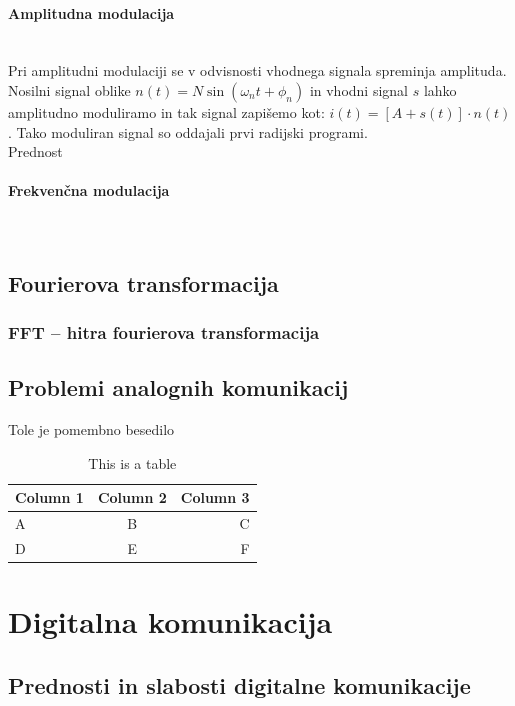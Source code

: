 \documentclass[12pt]{article}
\begin{document}
            \paragraph{Amplitudna modulacija} \mbox{}\\ 
                Pri amplitudni modulaciji se v odvisnosti vhodnega signala 
                spreminja amplituda. 
                Nosilni signal oblike $n(t) = N\sin(\omega_{n} t + \phi_{n})$ in 
                vhodni signal $s$ lahko amplitudno moduliramo in tak signal 
                zapišemo kot: $i(t) = [A + s(t)]\cdot n(t)$. Tako moduliran 
                signal so oddajali prvi radijski programi.\\
                Prednost 
            \paragraph{Frekvenčna modulacija} \mbox{}\\
            

    \newpage
    \subsection{Fourierova transformacija}
        \subsubsection{FFT – hitra fourierova transformacija}
    \subsection{Problemi analognih komunikacij}
        Tole je pomembno besedilo

\begin{table}[h]
    \centering
    \caption{This is a table}
    \begin{tabular}{lcr}
      \hline
      Column 1 & Column 2 & Column 3 \\
      \hline
      A & B & C \\
      D & E & F \\
      \hline
    \end{tabular}
    \label{tab:table}
\end{table}  


\newpage
\section{Digitalna komunikacija}
    \subsection{Prednosti in slabosti digitalne komunikacije}
\end{document}
